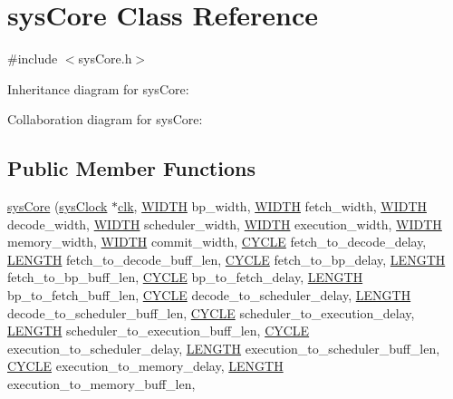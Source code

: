 \hypertarget{classsysCore}{
\section{sysCore Class Reference}
\label{classsysCore}
}


{\ttfamily \#include $<$sysCore.h$>$}



Inheritance diagram for sysCore:


Collaboration diagram for sysCore:
\subsection*{Public Member Functions}
\begin{DoxyCompactItemize}
\item 
\hyperlink{classsysCore_a901e2a907eaf392df936326bda6173f7}{sysCore} (\hyperlink{classsysClock}{sysClock} $\ast$\hyperlink{g__objs_8h_afc4784c140eed1743728e83840e91c12}{clk}, \hyperlink{global_2global_8h_a6fa2e24b8a418fa215e183264cbea3aa}{WIDTH} bp\_\-width, \hyperlink{global_2global_8h_a6fa2e24b8a418fa215e183264cbea3aa}{WIDTH} fetch\_\-width, \hyperlink{global_2global_8h_a6fa2e24b8a418fa215e183264cbea3aa}{WIDTH} decode\_\-width, \hyperlink{global_2global_8h_a6fa2e24b8a418fa215e183264cbea3aa}{WIDTH} scheduler\_\-width, \hyperlink{global_2global_8h_a6fa2e24b8a418fa215e183264cbea3aa}{WIDTH} execution\_\-width, \hyperlink{global_2global_8h_a6fa2e24b8a418fa215e183264cbea3aa}{WIDTH} memory\_\-width, \hyperlink{global_2global_8h_a6fa2e24b8a418fa215e183264cbea3aa}{WIDTH} commit\_\-width, \hyperlink{global_2global_8h_a7e19a550ec11d1ed921deb20c22efb5b}{CYCLE} fetch\_\-to\_\-decode\_\-delay, \hyperlink{binaryTranslator_2global_8h_a9f35cc405c37836572563f16d0302ba6}{LENGTH} fetch\_\-to\_\-decode\_\-buff\_\-len, \hyperlink{global_2global_8h_a7e19a550ec11d1ed921deb20c22efb5b}{CYCLE} fetch\_\-to\_\-bp\_\-delay, \hyperlink{binaryTranslator_2global_8h_a9f35cc405c37836572563f16d0302ba6}{LENGTH} fetch\_\-to\_\-bp\_\-buff\_\-len, \hyperlink{global_2global_8h_a7e19a550ec11d1ed921deb20c22efb5b}{CYCLE} bp\_\-to\_\-fetch\_\-delay, \hyperlink{binaryTranslator_2global_8h_a9f35cc405c37836572563f16d0302ba6}{LENGTH} bp\_\-to\_\-fetch\_\-buff\_\-len, \hyperlink{global_2global_8h_a7e19a550ec11d1ed921deb20c22efb5b}{CYCLE} decode\_\-to\_\-scheduler\_\-delay, \hyperlink{binaryTranslator_2global_8h_a9f35cc405c37836572563f16d0302ba6}{LENGTH} decode\_\-to\_\-scheduler\_\-buff\_\-len, \hyperlink{global_2global_8h_a7e19a550ec11d1ed921deb20c22efb5b}{CYCLE} scheduler\_\-to\_\-execution\_\-delay, \hyperlink{binaryTranslator_2global_8h_a9f35cc405c37836572563f16d0302ba6}{LENGTH} scheduler\_\-to\_\-execution\_\-buff\_\-len, \hyperlink{global_2global_8h_a7e19a550ec11d1ed921deb20c22efb5b}{CYCLE} execution\_\-to\_\-scheduler\_\-delay, \hyperlink{binaryTranslator_2global_8h_a9f35cc405c37836572563f16d0302ba6}{LENGTH} execution\_\-to\_\-scheduler\_\-buff\_\-len, \hyperlink{global_2global_8h_a7e19a550ec11d1ed921deb20c22efb5b}{CYCLE} execution\_\-to\_\-memory\_\-delay, \hyperlink{binaryTranslator_2global_8h_a9f35cc405c37836572563f16d0302ba6}{LENGTH} execution\_\-to\_\-memory\_\-buff\_\-len, 
\end{DoxyCompactItemize}
